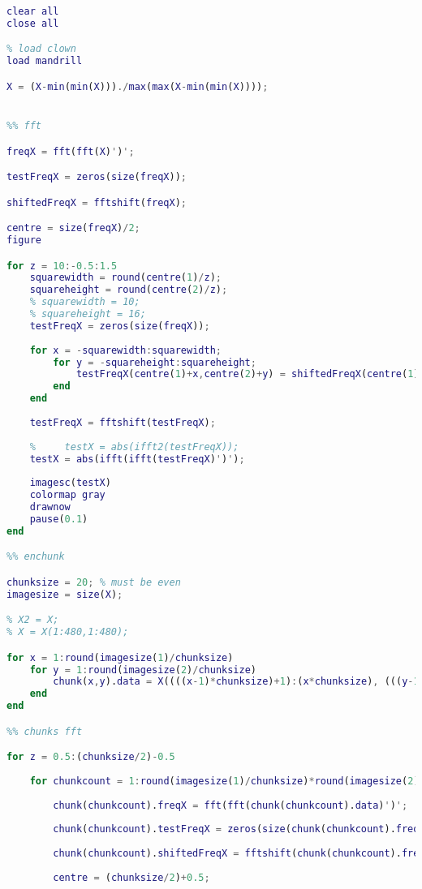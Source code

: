 \begin{lstlisting}[language=Matlab, label = lst:chunk_comp]
clear all
close all

% load clown
load mandrill

X = (X-min(min(X)))./max(max(X-min(min(X))));


%% fft

freqX = fft(fft(X)')';

testFreqX = zeros(size(freqX));

shiftedFreqX = fftshift(freqX);

centre = size(freqX)/2;
figure

for z = 10:-0.5:1.5
    squarewidth = round(centre(1)/z);
    squareheight = round(centre(2)/z);
    % squarewidth = 10;
    % squareheight = 16;
    testFreqX = zeros(size(freqX));
    
    for x = -squarewidth:squarewidth;
        for y = -squareheight:squareheight;
            testFreqX(centre(1)+x,centre(2)+y) = shiftedFreqX(centre(1)+x,centre(2)+y);
        end
    end
    
    testFreqX = fftshift(testFreqX);
    
    %     testX = abs(ifft2(testFreqX));
    testX = abs(ifft(ifft(testFreqX)')');
    
    imagesc(testX)
    colormap gray
    drawnow
    pause(0.1)
end

%% enchunk

chunksize = 20; % must be even
imagesize = size(X);

% X2 = X;
% X = X(1:480,1:480);

for x = 1:round(imagesize(1)/chunksize)
    for y = 1:round(imagesize(2)/chunksize)
        chunk(x,y).data = X((((x-1)*chunksize)+1):(x*chunksize), (((y-1)*chunksize)+1):(y*chunksize));
    end
end

%% chunks fft

for z = 0.5:(chunksize/2)-0.5
    
    for chunkcount = 1:round(imagesize(1)/chunksize)*round(imagesize(2)/chunksize)
        
        chunk(chunkcount).freqX = fft(fft(chunk(chunkcount).data)')';
        
        chunk(chunkcount).testFreqX = zeros(size(chunk(chunkcount).freqX));
        
        chunk(chunkcount).shiftedFreqX = fftshift(chunk(chunkcount).freqX);
        
        centre = (chunksize/2)+0.5;
        

\end{lstlisting}
